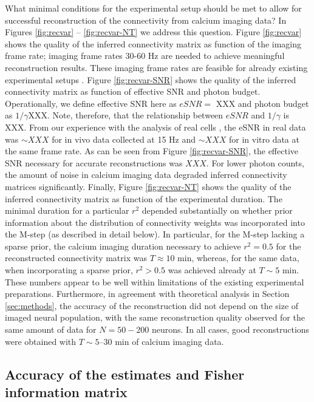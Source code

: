 What minimal conditions for the experimental setup should be met to allow for successful reconstruction of the connectivity from calcium imaging data? In Figures \ref{fig:recvar} -- \ref{fig:recvar-NT} we address this question. Figure \ref{fig:recvar} shows the quality of the inferred connectivity matrix as function of the imaging frame rate; imaging frame rates 30-60 Hz are needed to achieve meaningful reconstruction results. These imaging frame rates are feasible for already existing experimental setups \cite{NguyenParker01,ReddySaggau05,Iyer06,SalomeBourdieu06,ReddySaggau08}. Figure \ref{fig:recvar-SNR} shows the quality of the inferred connectivity matrix as function of effective SNR and photon budget. Operationally, we define effective SNR here as $eSNR=$ XXX and photon budget as $1/\gamma$XXX. Note, therefore, that the relationship between $eSNR$ and $1/\gamma$ is XXX. From our experience with the analysis of real cells \cite{Vogelstein2009}, the eSNR in real data was $\sim XXX$ for in vivo data collected at 15  Hz and $\sim XXX$  for in vitro data at the same frame rate. As can be seen from Figure \ref{fig:recvar-SNR}, the effective SNR necessary for accurate reconstructions was $XXX$. For lower photon counts, the amount of noise in calcium imaging data degraded inferred connectivity matrices significantly. Finally, Figure \ref{fig:recvar-NT} shows the quality of the inferred connectivity matrix as function of the experimental duration. The minimal duration for a particular $r^2$ depended substantially on whether prior information about the distribution of connectivity weights was incorporated into the M-step (as described in detail below). In particular, for the M-step lacking a sparse prior, the calcium imaging duration necessary to achieve $r^2=0.5$ for the reconstructed connectivity matrix was $T\approx 10$ min, whereas, for the same data, when incorporating a sparse prior, $r^2>0.5$ was achieved already at $T\sim 5$ min. These numbers appear to be well within limitations of the existing experimental preparations. Furthermore, in agreement with theoretical analysis in Section \ref{sec:methods}, the accuracy of the reconstruction did not depend on the size of imaged neural population, with the same reconstruction quality observed for the same amount of data for $N=50-200$ neurons. In all cases, good reconstructions were obtained  with $T\sim 5$--$30$ min of calcium imaging data.


\subsection{Accuracy of the estimates and Fisher information matrix} \label{sec:methods:accuracy_Fisher}

